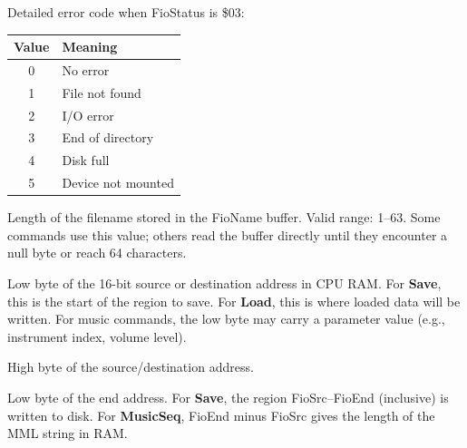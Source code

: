 

Detailed error code when FioStatus is \$03:

\begin{center}
\small
\begin{tabular}{@{}cl@{}}
\toprule
\textbf{Value} & \textbf{Meaning} \\
\midrule
0 & No error \\
1 & File not found \\
2 & I/O error \\
3 & End of directory \\
4 & Disk full \\
5 & Device not mounted \\
\bottomrule
\end{tabular}
\end{center}



Length of the filename stored in the FioName buffer.  Valid range: 1--63.
Some commands use this value; others read the buffer directly until they
encounter a null byte or reach 64 characters.



Low byte of the 16-bit source or destination address in CPU RAM.  For
\textbf{Save}, this is the start of the region to save.  For \textbf{Load},
this is where loaded data will be written.  For music commands, the low byte
may carry a parameter value (e.g., instrument index, volume level).


High byte of the source/destination address.



Low byte of the end address.  For \textbf{Save}, the region
FioSrc--FioEnd (inclusive) is written to disk.  For \textbf{MusicSeq}, FioEnd
minus FioSrc gives the length of the MML string in RAM.


